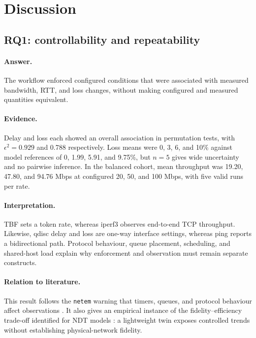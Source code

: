 \section{Discussion}
\label{sec:discussion}

\subsection{RQ1: controllability and repeatability}

\paragraph{Answer.} The workflow enforced configured conditions that were associated with measured bandwidth, RTT, and loss changes, without making configured and measured quantities equivalent.

\paragraph{Evidence.} Delay and loss each showed an overall association in permutation tests, with $\epsilon^2=0.929$ and 0.788 respectively. Loss means were 0, 3, 6, and 10\% against model references of 0, 1.99, 5.91, and 9.75\%, but $n=5$ gives wide uncertainty and no pairwise inference. In the balanced cohort, mean throughput was 19.20, 47.80, and 94.76 Mbps at configured 20, 50, and 100 Mbps, with five valid runs per rate.

\paragraph{Interpretation.} TBF sets a token rate, whereas iperf3 observes end-to-end TCP throughput. Likewise, qdisc delay and loss are one-way interface settings, whereas ping reports a bidirectional path. Protocol behaviour, queue placement, scheduling, and shared-host load explain why enforcement and observation must remain separate constructs.

\paragraph{Relation to literature.} This result follows the \texttt{netem} warning that timers, queues, and protocol behaviour affect observations \citep{iproute2netem}. It also gives an empirical instance of the fidelity--efficiency trade-off identified for NDT models \citep{hui2023digitaltwin}: a lightweight twin exposes controlled trends without establishing physical-network fidelity.

